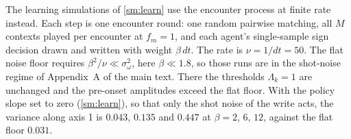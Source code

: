 \documentclass[
  aps,prx,
  preprint,
  superscriptaddress,
  nofootinbib
]{revtex4-2}
\newcommand{\sidn}{\sigma_{\omega}}
\begin{document}
The learning simulations of \cref{sm:learn} use the encounter process at finite rate instead. Each step is one encounter round: one random pairwise matching, all $M$ contexts played per encounter at $f_m=1$, and each agent's single-sample sign decision drawn and written with weight $\beta\,dt$. The rate is $\nu=1/dt=50$. The flat noise floor requires $\beta^2/\nu\ll\sidn^2$, here $\beta\ll1.8$, so those runs are in the shot-noise regime of Appendix~A of the main text. There the thresholds $\Lambda_k=1$ are unchanged and the pre-onset amplitudes exceed the flat floor. With the policy slope set to zero (\cref{sm:learn}), so that only the shot noise of the write acts, the variance along axis 1 is $0.043$, $0.135$ and $0.447$ at $\beta=2$, $6$, $12$, against the flat floor $0.031$.

\ifdefined\CEcombined\else\fi
\end{document}
